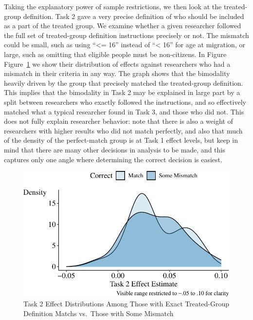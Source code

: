 \documentclass[
  letterpaper,
  DIV=11,
  numbers=noendperiod]{scrartcl}
\begin{document}
Taking the explanatory power of sample restrictions, we then look at the
treated-group definition. Task 2 gave a very precise definition of who
should be included as a part of the treated group. We examine whether a
given researcher followed the full set of treated-group definition
instructions precisely or not. The mismatch could be small, such as
using ``\textless= 16'' instead of ``\textless{} 16'' for age at
migration, or large, such as omitting that eligible people must be
non-citizens. In Figure Figure~\ref{fig-match-vs-mismatch} we show their
distribution of effects against researchers who had a mismatch in their
criteria in any way. The graph shows that the bimodality heavily driven
by the group that precisely matched the treated-group definition. This
implies that the bimodality in Task 2 may be explained in large part by
a split between researchers who exactly followed the instructions, and
so effectively matched what a typical researcher found in Task 3, and
those who did not. This does not fully explain researcher behavior: note
that there is also a weight of researchers with higher results who did
not match perfectly, and also that much of the density of the
perfect-match group is at Task 1 effect levels, but keep in mind that
there are many other decisions in analysis to be made, and this captures
only one angle where determining the correct decision is easiest.

\begin{figure}

{\centering \includegraphics{The-Sources-of-Researcher-Variation-in-Economics_files/figure-pdf/fig-match-vs-mismatch-1.pdf}

}

\caption{\label{fig-match-vs-mismatch}Task 2 Effect Distributions Among
Those with Exact Treated-Group Definition Matchs vs.~Those with Some
Mismatch}

\end{figure}
\end{document}
